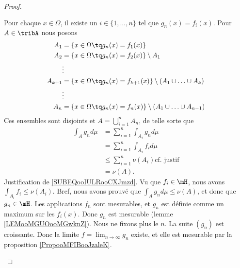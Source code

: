\begin{proof}
\begin{subproof}
		Pour chaque \( x\in\Omega\), il existe un \( i\in\{ 1,\ldots,n \}\) tel que \( g_n(x)=f_i(x)\). Pour \( A\in \tribA\) nous posons
		\begin{subequations}
			\begin{align}
				A_1     & =\{ x\in\Omega\tq g_n(x)=f_1(x) \}                                       \\
				A_2     & =\{ x\in\Omega\tq g_n(x)=f_2(x) \}\setminus A_1                          \\
				        & \vdots                                                                   \\
				A_{k+1} & =\{ x\in\Omega\tq g_n(x)=f_{k+1}(x) \}\setminus (A_1\cup\ldots \cup A_k) \\
				        & \vdots                                                                   \\
				A_n     & =\{ x\in\Omega\tq g_n(x)=f_n(x) \}\setminus (A_1\cup\ldots \cup A_{n-1})
			\end{align}
		\end{subequations}
		Ces ensembles sont disjoints et \( A=\bigcup_{i=1}^nA_n\), de telle sorte que
		\begin{subequations}
			\begin{align}
				\int_Ag_nd\mu & =\sum_{i=1}^n\int_{A_i}g_nd\mu                                             \\
				              & =\sum_{i=1}^n\int_{A_i}f_id\mu                                             \\
				              & \leq \sum_{i=1}^n\nu(A_i)   \text{cf. justif}		\label{SUBEQooIULRooCXJmzd} \\
				              & =\nu(A).
			\end{align}
		\end{subequations}
		Justification de \eqref{SUBEQooIULRooCXJmzd}. Vu que \( f_i\in \mH\), nous avons \( \int_{A_i}f_i\leq \nu(A_i)\). Bref, nous avons prouvé que \( \int_Ag_nd\mu\leq \nu(A)\), et donc que \( g_n\in \mH\).
		Les applications \( f_n\) sont mesurables, et \( g_n\) est définie comme un maximum sur les \( f_i(x)\). Donc \( g_n\) est mesurable (lemme \ref{LEMooMGUOooMGwknZ}).
		Nous ne fixons plus le \( n\). La suite \( (g_n)\) est croissante. Donc la limite \( f=\lim_{n\to\infty}g_n\) existe, et elle est mesurable par la proposition \ref{PropooMFIBooJzaleK}.

		\spitem[\( \int_{\alpha}fd\mu=\alpha\)]		\label{SPITEMooGLPCooBjBAdm}


\end{subproof}
\end{proof}
